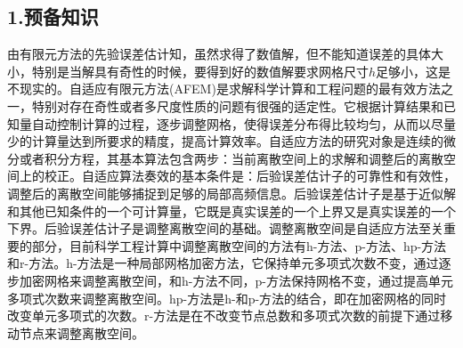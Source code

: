 \documentclass{article}
\begin{document}
\subsection{1.预备知识}
由有限元方法的先验误差估计知，虽然求得了数值解，但不能知道误差的具体大小，特别是当解具有奇性的时候，要得到好的数值解要求网格尺寸$h$足够小，这是不现实的。自适应有限元方法(AFEM)是求解科学计算和工程问题的最有效方法之一，特别对存在奇性或者多尺度性质的问题有很强的适定性。它根据计算结果和已知量自动控制计算的过程，逐步调整网格，使得误差分布得比较均匀，从而以尽量少的计算量达到所要求的精度，提高计算效率。自适应方法的研究对象是连续的微分或者积分方程，其基本算法包含两步：当前离散空间上的求解和调整后的离散空间上的校正。自适应算法奏效的基本条件是：后验误差估计子的可靠性和有效性，调整后的离散空间能够捕捉到足够的局部高频信息。后验误差估计子是基于近似解和其他已知条件的一个可计算量，它既是真实误差的一个上界又是真实误差的一个下界。后验误差估计子是调整离散空间的基础。调整离散空间是自适应方法至关重要的部分，目前科学工程计算中调整离散空间的方法有h-方法、p-方法、hp-方法和r-方法。h-方法是一种局部网格加密方法，它保持单元多项式次数不变，通过逐步加密网格来调整离散空间，和h-方法不同，p-方法保持网格不变，通过提高单元多项式次数来调整离散空间。hp-方法是h-和p-方法的结合，即在加密网格的同时改变单元多项式的次数。r-方法是在不改变节点总数和多项式次数的前提下通过移动节点来调整离散空间。
\end{document}
